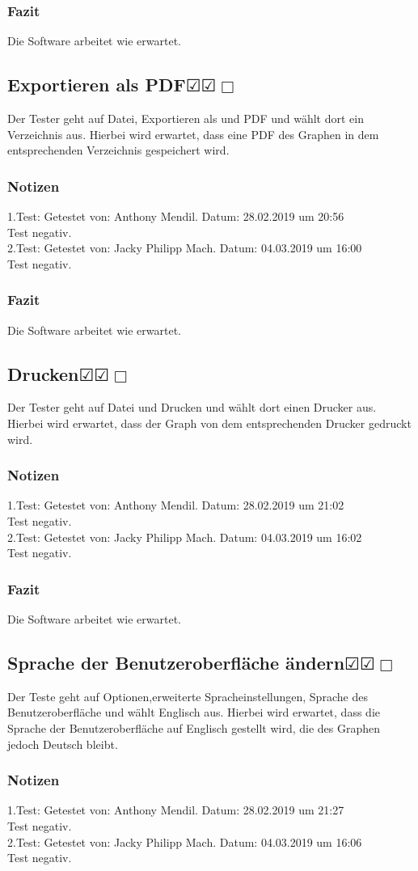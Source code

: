 \documentclass[enabledeprecatedfontcommands]{scrartcl}
\newcommand{\subsectiont}[2]{\subsection[#1]{#1{\normalsize\normalfont #2}}}
\newcommand{\leer}{$\Box$}
\newcommand{\ok}{$\CheckedBox$}
\begin{document}
\subsubsection{Fazit}
Die Software arbeitet wie erwartet.

\subsectiont{Exportieren als PDF}{\dotfill\ok\ok\leer}
Der Tester geht auf Datei, Exportieren als und PDF und wählt dort ein Verzeichnis aus. Hierbei wird erwartet, dass eine PDF des Graphen in dem entsprechenden Verzeichnis gespeichert wird. 
\subsubsection{Notizen}
1.Test: Getestet von: Anthony Mendil. Datum: 28.02.2019 um 20:56 \\
Test negativ.\\
2.Test: Getestet von: Jacky Philipp Mach. Datum: 04.03.2019 um 16:00 \\
Test negativ.
\subsubsection{Fazit}
Die Software arbeitet wie erwartet.

\subsectiont{Drucken}{\dotfill\ok\ok\leer}
Der Tester geht auf Datei und Drucken und wählt dort einen Drucker aus. Hierbei wird erwartet, dass der Graph von dem entsprechenden Drucker gedruckt wird. 
\subsubsection{Notizen}
1.Test: Getestet von: Anthony Mendil. Datum: 28.02.2019 um 21:02 \\
Test negativ.\\
2.Test: Getestet von: Jacky Philipp Mach. Datum: 04.03.2019 um 16:02\\
Test negativ.
\subsubsection{Fazit}
Die Software arbeitet wie erwartet.

\subsectiont{Sprache der Benutzeroberfläche ändern}{\dotfill\ok\ok\leer}
Der Teste geht auf Optionen,erweiterte Spracheinstellungen, Sprache des Benutzeroberfläche und wählt Englisch aus. Hierbei wird erwartet, dass die Sprache der Benutzeroberfläche auf Englisch gestellt wird, die des Graphen jedoch Deutsch bleibt.
\subsubsection{Notizen}
1.Test: Getestet von: Anthony Mendil. Datum: 28.02.2019 um 21:27 \\
Test negativ.\\
2.Test: Getestet von: Jacky Philipp Mach. Datum: 04.03.2019 um 16:06 \\
Test negativ.
\end{document}
